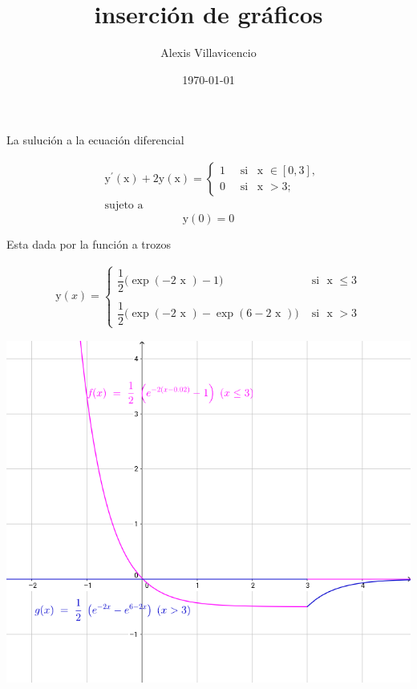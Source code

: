 \documentclass[a4paper,12pt]{article}
\title{inserción de gráficos}
\author{Alexis Villavicencio}
\date{\today}
\begin{document}
\maketitle
La suluci\'{o}n a la ecuaci\'{o}n diferencial

\begin{align*}
 &\text{y}^{'}(\text{x})+2\text{y}(\text{x})=
 \begin{cases}
 1 \quad \text{ si } \, \text{ x }\in[0,3],\\
 0 \quad \text{ si } \, \text{ x } > 3;
 \end{cases}  \\
 &\text{sujeto a}
\end{align*}
\[
\text{y}(0)=0
\]

Esta dada por la función a trozos 

\begin{align*}
 \text{y}(x)=
 \begin{cases}
 \dfrac{1}{2} \big(\exp(-2\text{ x }) -1) \quad &\text{ si } \text{ x } \leq 3\\
 \\
\dfrac{1}{2} \big(\exp(-2\text{ x })- \exp(6-2\text{ x }) )  &\text{ si } \text{ x } > 3
\end{cases} 
\end{align*}
\begin{center}
 \includegraphics[scale=0.5]{figura1}
\end{center} 
 
\end{document}
